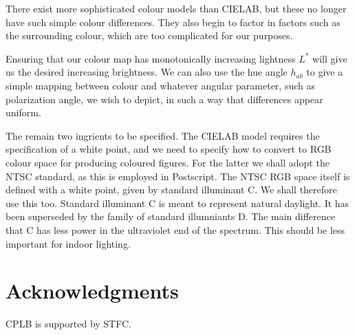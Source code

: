 \documentclass[useAMS,usedcolumn,usegraphicx,usenatbib]{mn2e}
\begin{document}
There exist more sophisticated colour models than CIELAB, but these no longer have such simple colour differences. They also begin to factor in factors such as the surrounding colour, which are too complicated for our purposes.

Ensuring that our colour map has monotonically increasing lightness $L^\ast$ will give us the desired increasing brightness. We can also use the hue angle $h_{ab}$ to give a simple mapping between colour and whatever angular parameter, such as polarization angle, we wish to depict, in such a way that differences appear uniform.

The remain two ingrients to be specified. The CIELAB model requires the specification of a white point, and we need to specify how to convert to RGB colour space for producing coloured figures. For the latter we shall adopt the NTSC standard, as this is employed in Postscript. The NTSC RGB space itself is defined with a white point, given by standard illuminant C. We shall therefore use this too. Standard illuminant C is meant to represent natural daylight. It has been superseded by the family of standard illumniants D. The main difference that C has less power in the ultraviolet end of the spectrum.  This should be less important for indoor lighting.

\section*{Acknowledgments}

CPLB is supported by STFC.




\appendix



\bsp

\label{lastpage}
\end{document}
